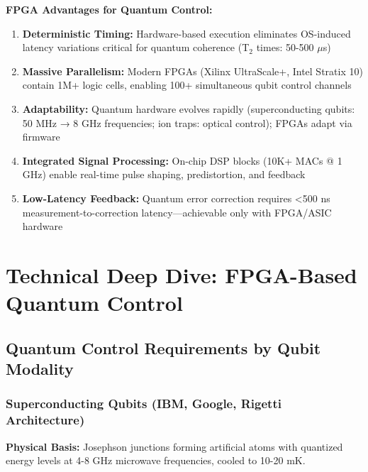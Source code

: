 \documentclass[12pt,a4paper]{article}
\begin{document}
\textbf{FPGA Advantages for Quantum Control:}
\begin{enumerate}[leftmargin=*]
    \item \textbf{Deterministic Timing:} Hardware-based execution eliminates OS-induced latency variations critical for quantum coherence (T$_2$ times: 50-500 $\mu$s)
    \item \textbf{Massive Parallelism:} Modern FPGAs (Xilinx UltraScale+, Intel Stratix 10) contain 1M+ logic cells, enabling 100+ simultaneous qubit control channels
    \item \textbf{Adaptability:} Quantum hardware evolves rapidly (superconducting qubits: 50 MHz → 8 GHz frequencies; ion traps: optical control); FPGAs adapt via firmware
    \item \textbf{Integrated Signal Processing:} On-chip DSP blocks (10K+ MACs @ 1 GHz) enable real-time pulse shaping, predistortion, and feedback
    \item \textbf{Low-Latency Feedback:} Quantum error correction requires <500 ns measurement-to-correction latency—achievable only with FPGA/ASIC hardware
\end{enumerate}

\newpage

\section{Technical Deep Dive: FPGA-Based Quantum Control}

\subsection{Quantum Control Requirements by Qubit Modality}

\subsubsection{Superconducting Qubits (IBM, Google, Rigetti Architecture)}

\textbf{Physical Basis:} Josephson junctions forming artificial atoms with quantized energy levels at 4-8 GHz microwave frequencies, cooled to 10-20 mK.
\end{document}
